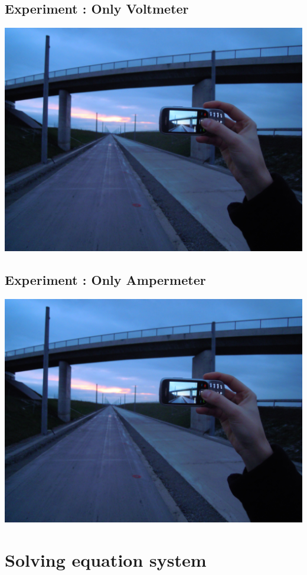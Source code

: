 \documentclass[11pt]{article}
\begin{document}
    \subsection{Experiment : Only Voltmeter}\label{subsec:experiment-2}
    \includegraphics[width=\linewidth]{images/schemes/scheme0.png}

    \subsection{Experiment : Only Ampermeter}\label{subsec:experiment-3}
    \includegraphics[width=\linewidth]{images/schemes/scheme0.png}


    \section{Solving equation system}\label{sec:solving-equation-system}
\end{document}
